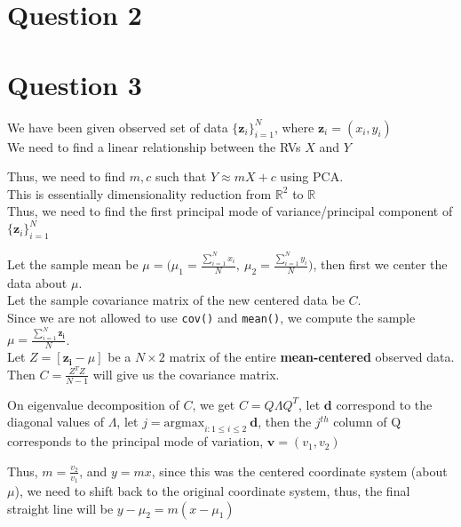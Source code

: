 \documentclass[11pt, fleqn]{article}
\begin{document}
\newpage
\section*{Question 2}
\setcounter{equation}{0}
\setcounter{figure}{0}

\newpage
\section*{Question 3}
\setcounter{equation}{0}
\setcounter{figure}{0}
We have been given observed set of data $\{ \mathbf{z}_i \}_{i=1}^{N}$, where $\mathbf{z}_i = (x_i, y_i)$\\
We need to find a linear relationship between the RVs $X$ and $Y$

\medskip
Thus, we need to find $m, c$ such that $Y \approx mX + c$ using PCA.\\
This is essentially dimensionality reduction from $\mathbb{R}^2$ to $\mathbb{R}$\\
Thus, we need to find the first principal mode of variance/principal component of $\{ \mathbf{z}_i \}_{i=1}^{N}$

\medskip
Let the sample mean be $\mu = \bigg(\mu_1 = \frac{\sum_{i=1}^{N}x_i}{N},\  \mu_2 = \frac{\sum_{i=1}^{N}y_i}{N}\bigg)$, then first we center the data about $\mu$.\\
Let the sample covariance matrix of the new centered data be $C$.\\
Since we are not allowed to use \texttt{cov()} and \texttt{mean()}, we compute the sample $\mu = \frac{\sum_{i=1}^{N}\mathbf{z_i}}{N}$.\\
Let $Z = [\mathbf{z_i} - \mu]$ be a $N\times2$ matrix of the entire \textbf{mean-centered} observed data.\\
Then $C = \frac{Z^T Z}{N-1}$ will give us the covariance matrix.

\medskip
On eigenvalue decomposition of $C$, we get $C = Q\Lambda Q^T$, let $\mathbf{d}$ correspond to the diagonal values of $\Lambda$, let $j = \text{argmax}_{i: 1\le i\le 2} \ \mathbf{d}$, then the $j^{th}$ column of Q corresponds to the principal mode of variation, $\mathbf{v} = (v_1, v_2)$

\medskip
Thus, $m = \frac{v_2}{v_1}$, and $y = mx$, since this was the centered coordinate system (about $\mu$), we need to shift back to the original coordinate system, thus, the final straight line will be $y-\mu_2 = m(x - \mu_1)$
\end{document}
